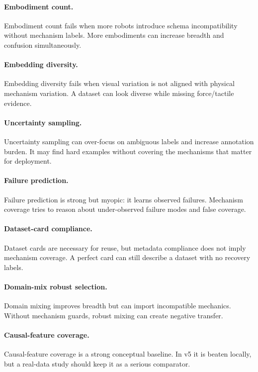 \documentclass{article}
\begin{document}
\paragraph{Embodiment count.}
Embodiment count fails when more robots introduce schema incompatibility without mechanism labels. More embodiments can increase breadth and confusion simultaneously.

\paragraph{Embedding diversity.}
Embedding diversity fails when visual variation is not aligned with physical mechanism variation. A dataset can look diverse while missing force/tactile evidence.

\paragraph{Uncertainty sampling.}
Uncertainty sampling can over-focus on ambiguous labels and increase annotation burden. It may find hard examples without covering the mechanisms that matter for deployment.

\paragraph{Failure prediction.}
Failure prediction is strong but myopic: it learns observed failures. Mechanism coverage tries to reason about under-observed failure modes and false coverage.

\paragraph{Dataset-card compliance.}
Dataset cards are necessary for reuse, but metadata compliance does not imply mechanism coverage. A perfect card can still describe a dataset with no recovery labels.

\paragraph{Domain-mix robust selection.}
Domain mixing improves breadth but can import incompatible mechanics. Without mechanism guards, robust mixing can create negative transfer.

\paragraph{Causal-feature coverage.}
Causal-feature coverage is a strong conceptual baseline. In v5 it is beaten locally, but a real-data study should keep it as a serious comparator.
\end{document}
